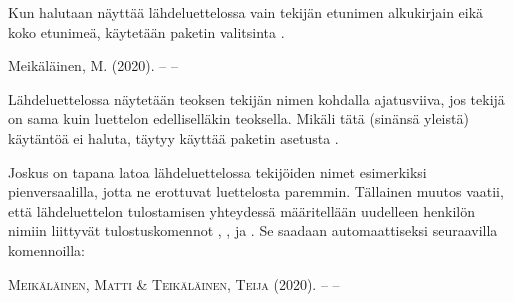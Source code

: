 \begin{koodilohkosis}
  \usepackage[style=authoryear, maxbibnames=99, minbibnames=3,
    maxcitenames=3, mincitenames=1, uniquelist=true]{biblatex}
\end{koodilohkosis}

Kun halutaan näyttää lähdeluettelossa vain tekijän etunimen alkukirjain
eikä koko etunimeä, käytetään paketin valitsinta .

\begin{koodilohkosis}
  \usepackage[…, giveninits]{biblatex}
\end{koodilohkosis}

\begin{tulossis}
  Meikäläinen, M. (2020). -- --
\end{tulossis}

Lähdeluettelossa näytetään teoksen tekijän nimen kohdalla ajatusviiva,
jos tekijä on sama kuin luettelon edelliselläkin teoksella. Mikäli tätä
(sinänsä yleistä) käytäntöä ei haluta, täytyy käyttää paketin asetusta
.

\begin{koodilohkosis}
  \usepackage[…, dashed=false]{biblatex}
\end{koodilohkosis}

Joskus on tapana latoa lähdeluettelossa tekijöiden nimet esimerkiksi
pienversaalilla, jotta ne erottuvat luettelosta paremmin. Tällainen
muutos vaatii, että lähdeluettelon tulostamisen yhteydessä määritellään
uudelleen henkilön nimiin liittyvät tulostuskomennot
, ,
 ja . Se saadaan
automaattiseksi seuraavilla komennoilla:

\begin{koodilohkosis}
\end{koodilohkosis}

\begin{tulossis}
  \textsc{Meikäläinen}, \textsc{Matti} \& \textsc{Teikäläinen},
  \textsc{Teija} (2020). -- --
\end{tulossis}

